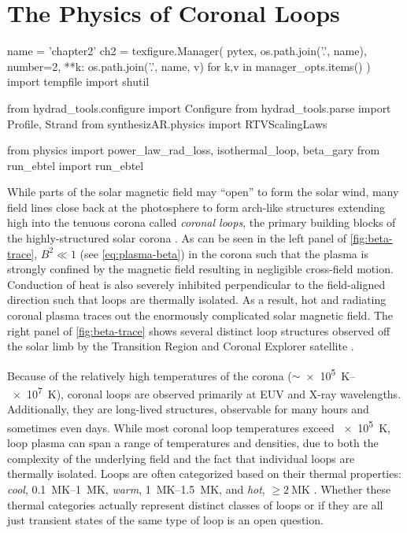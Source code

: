 \chapter{The Physics of Coronal Loops}\label{ch:loops}

\begin{pycode}[chapter2]
name = 'chapter2'
ch2 = texfigure.Manager(
    pytex,
    os.path.join('.', name),
    number=2,
    **{k: os.path.join('.', name, v) for k,v in manager_opts.items()}
)
import tempfile
import shutil

from hydrad_tools.configure import Configure
from hydrad_tools.parse import Profile, Strand
from synthesizAR.physics import RTVScalingLaws

from physics import power_law_rad_loss, isothermal_loop, beta_gary
from run_ebtel import run_ebtel
\end{pycode}

While parts of the solar magnetic field may ``open'' to form the solar wind, many field lines close back at the photosphere to form arch-like structures extending high into the tenuous corona called \textit{coronal loops}, the primary building blocks of the highly-structured solar corona \citep{reale_coronal_2010}. As can be seen in the left panel of \autoref{fig:beta-trace}, $B^2\ll1$ (see \autoref{eq:plasma-beta}) in the corona such that the plasma is strongly confined by the magnetic field resulting in negligible cross-field motion. Conduction of heat is also severely inhibited perpendicular to the field-aligned direction such that loops are thermally isolated. As a result, hot and radiating coronal plasma traces out the enormously complicated solar magnetic field. The right panel of \autoref{fig:beta-trace} shows several distinct loop structures observed off the solar limb by the Transition Region and Coronal Explorer satellite \citep[TRACE,][]{handy_transition_1999}.

Because of the relatively high temperatures of the corona ($\sim$\SIrange{e5}{e7}{\kelvin}), coronal loops are observed primarily at EUV and X-ray wavelengths. Additionally, they are long-lived structures, observable for many hours and sometimes even days. While most coronal loop temperatures exceed \SI{e5}{\kelvin}, loop plasma can span a range of temperatures and densities, due to both the complexity of the underlying field and the fact that individual loops are thermally isolated. Loops are often categorized based on their thermal properties: \textit{cool}, \SIrange{0.1}{1}{\mega\kelvin}, \textit{warm}, \SIrange{1}{1.5}{\mega\kelvin}, and \textit{hot}, $\ge\SI{2}{\mega\kelvin}$ \citep{reale_coronal_2010}. Whether these thermal categories actually represent distinct classes of loops or if they are all just transient states of the same type of loop is an open question. 


